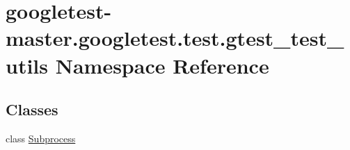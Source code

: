 \hypertarget{namespacegoogletest-master_1_1googletest_1_1test_1_1gtest__test__utils}{}\section{googletest-\/master.googletest.\+test.\+gtest\+\_\+test\+\_\+utils Namespace Reference}
\label{namespacegoogletest-master_1_1googletest_1_1test_1_1gtest__test__utils}
\subsection*{Classes}
\begin{DoxyCompactItemize}
\item 
class \mbox{\hyperlink{classgoogletest-master_1_1googletest_1_1test_1_1gtest__test__utils_1_1_subprocess}{Subprocess}}
\end{DoxyCompactItemize}
